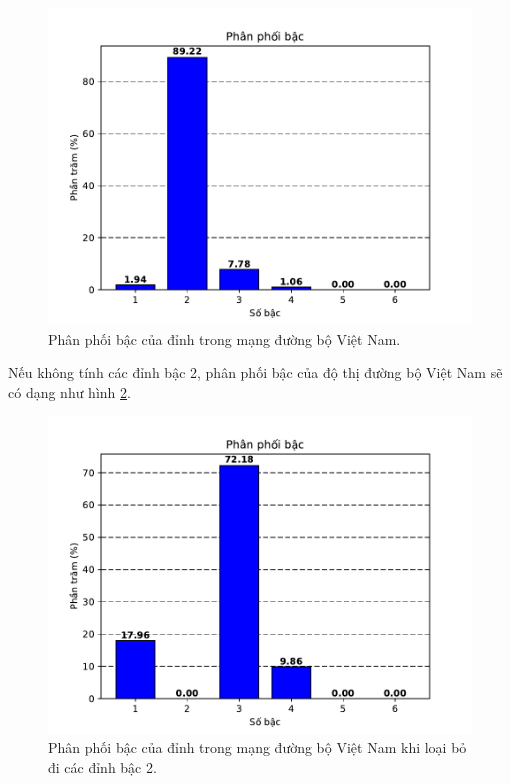 \documentclass[14pt, oneside, a4paper, openany]{scrartcl}
\begin{document}
\begin{figure}[!h]
	\centering
	\includegraphics[scale=0.9]{figures/degreedist.pdf} 
	\caption[Phân phối bậc của đỉnh trong mạng đường bộ Việt Nam]{Phân phối bậc của đỉnh trong mạng đường bộ Việt Nam.}
	\label{fig:degreedist}
\end{figure}

Nếu không tính các đỉnh bậc 2, phân phối bậc của độ thị đường bộ Việt Nam sẽ có dạng như hình \ref{fig:degreedist2}.

\begin{figure}[!h]
	\centering
	\includegraphics[scale=0.9]{figures/degreedist3.pdf} 
	\caption[Phân phối bậc của đỉnh trong mạng đường bộ Việt Nam khi loại bỏ đi các đỉnh bậc 2]{Phân phối bậc của đỉnh trong mạng đường bộ Việt Nam khi loại bỏ đi các đỉnh bậc 2.}
	\label{fig:degreedist2}
\end{figure}
\end{document}
